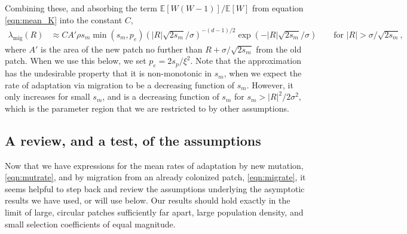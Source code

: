 \documentclass[10pt,letterpaper]{article}
\newcommand{\E}{\mathbb{E}}
\newcommand{\migrate}{\lambda_\text{mig}}
\begin{document}
Combining these, and absorbing the term $\E[W(W-1)]/\E[W]$ from equation \eqref{eqn:mean_K} 
into the constant $C$,
\begin{align} \label{eqn:migrate}
  \migrate(R) &\approx C A' \rho s_m \min(s_m,p_e) \left( |R| \sqrt{2 s_m}/\sigma \right)^{-(d-1)/2} \exp( - |R| \sqrt{2 s_m} / \sigma)  \qquad \text{for } |R| > \sigma/\sqrt{2 s_m}  ,
\end{align}
where $A'$ is the area of the new patch no further than $R+\sigma/\sqrt{2s_m}$
from the old patch.
When we use this below, we set $p_e = 2 s_p / \xi^2$.
Note that the approximation has the undesirable property that it is
non-monotonic in $s_m$, when we expect the rate of adaptation via
migration to be a decreasing function of $s_m$. However, it only increases for small $s_m$, 
and is a decreasing function of $s_m$ for $s_m > |R|^2 / 2 \sigma^2$, 
which is the parameter region that we are restricted to by other assumptions.


\subsection*{A review, and a test, of the assumptions}
\label{ss:assumptions}

Now that we have expressions for the mean rates of adaptation by new mutation, \eqref{eqn:mutrate},
and by migration from an already colonized patch, \eqref{eqn:migrate},
it seems helpful to step back and review the assumptions 
underlying the asymptotic results we have used, or will use below.
Our results should hold exactly in the limit of 
large, circular patches sufficiently far apart,
large population density,
and small selection coefficients of equal magnitude.
\end{document}
